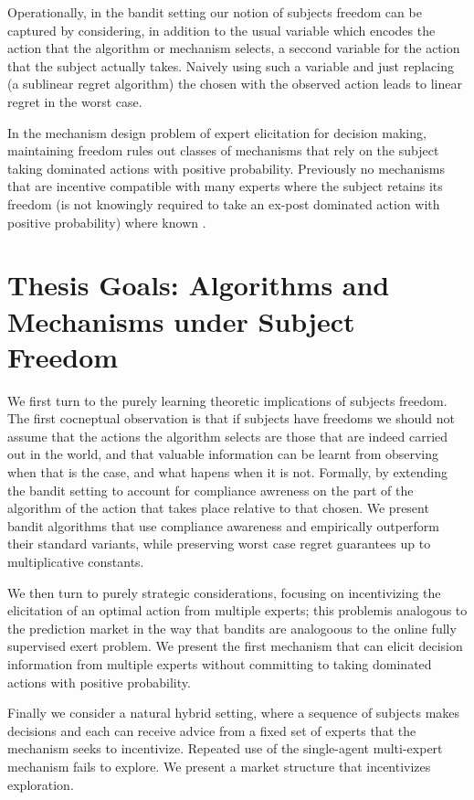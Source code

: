 Operationally, in the bandit setting our notion of subjects freedom can be captured by considering, in addition to the usual variable which encodes the action that the algorithm  or mechanism selects, a seccond variable for the action that the subject actually takes. Naively using such a variable and just replacing (a sublinear regret algorithm) the chosen with the observed action leads to linear regret in the worst case. 

In the mechanism design problem of expert elicitation for decision making, maintaining freedom rules out classes of mechanisms that rely on the subject taking dominated actions with positive probability. Previously no  mechanisms that are incentive compatible with many experts where the subject retains its freedom (is not knowingly required to take an ex-post dominated action with positive probability) where known \cite{othman2010decision,chen2014eliciting}.




\section{Thesis Goals: Algorithms and Mechanisms under Subject Freedom}

We first turn to the purely learning theoretic implications of subjects freedom. The first cocneptual observation is that if subjects have freedoms we should not assume that the actions the algorithm selects are those that are indeed carried out in the world, and that valuable information can be learnt from observing when that is the case, and what hapens when it is not.
Formally, by extending the bandit setting to account for compliance awreness on the part of the algorithm of the action that takes place relative to that chosen. We present bandit algorithms that use compliance awareness and empirically  outperform their standard variants, while preserving worst case regret guarantees up to multiplicative constants. 

We then turn to purely strategic considerations, focusing on incentivizing the elicitation of an optimal action from multiple experts; this problemis analogous to the prediction market in the way that bandits are analogoous to the online fully supervised exert problem. 
We present the first mechanism that can elicit decision  information from multiple experts without committing to taking dominated actions with positive probability. 

Finally we consider a natural hybrid setting, where a sequence of subjects makes decisions and each can receive advice from a fixed set of experts that the mechanism seeks to incentivize. Repeated use of the single-agent multi-expert mechanism fails to explore. We present a market structure that incentivizes exploration.



